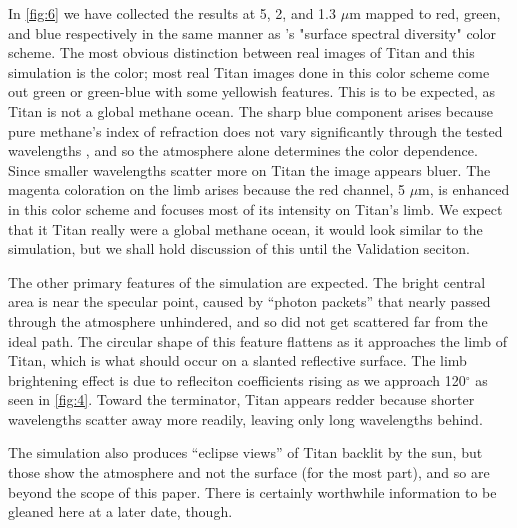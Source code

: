 \documentclass[twocolumn,linenumbers]{aastex631}
\begin{document}
In \ref{fig:6} we have collected the results at 5, 2, and 1.3 $\mu$m mapped to red, green, and blue respectively in the same manner as \cite{Barnes2018}'s "surface spectral diversity" color scheme. The most obvious distinction between real images of Titan and this simulation is the color; most real Titan images done in this color scheme come out green or green-blue with some yellowish features. This is to be expected, as Titan is not a global methane ocean. The sharp blue component arises because pure methane's index of refraction does not vary significantly through the tested wavelengths \citep{Martonchik1994}, and so the atmosphere alone determines the color dependence. Since smaller wavelengths scatter more on Titan \citep{EsSayeh2023} the image appears bluer. The magenta coloration on the limb arises because the red channel, 5 $\mu$m, is enhanced in this color scheme and focuses most of its intensity on Titan's limb. We expect that it Titan really were a global methane ocean, it would look similar to the simulation, but we shall hold discussion of this until the Validation seciton.

The other primary features of the simulation are expected. The bright central area is near the specular point, caused by ``photon packets'' that nearly passed through the atmosphere unhindered, and so did not get scattered far from the ideal path. The circular shape of this feature flattens as it approaches the limb of Titan, which is what should occur on a slanted reflective surface. The limb brightening effect is due to refleciton coefficients rising as we approach 120$^{\circ}$ as seen in \ref{fig:4}. Toward the terminator, Titan appears redder because shorter wavelengths scatter away more readily, leaving only long wavelengths behind.

The simulation also produces ``eclipse views'' of Titan backlit by the sun, but those show the atmosphere and not the surface (for the most part), and so are beyond the scope of this paper. There is certainly worthwhile information to be gleaned here at a later date, though. 
\end{document}
